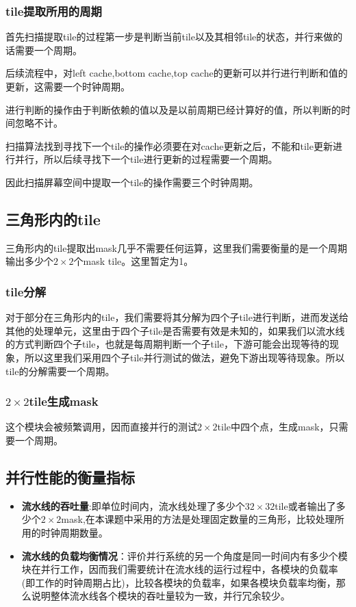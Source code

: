 \subsubsection{tile提取所用的周期}

首先扫描提取tile的过程第一步是判断当前tile以及其相邻tile的状态，并行来做的话需要一个周期。

后续流程中，对left cache,bottom cache,top cache的更新可以并行进行判断和值的更新，这需要一个时钟周期。

进行判断的操作由于判断依赖的值以及是以前周期已经计算好的值，所以判断的时间忽略不计。

扫描算法找到寻找下一个tile的操作必须要在对cache更新之后，不能和tile更新进行并行，所以后续寻找下一个tile进行更新的过程需要一个周期。

因此扫描屏幕空间中提取一个tile的操作需要三个时钟周期。

\subsection{三角形内的tile}
三角形内的tile提取出mask几乎不需要任何运算，这里我们需要衡量的是一个周期输出多少个$2\times 2$个mask tile。这里暂定为1。

\subsubsection{tile分解}

对于部分在三角形内的tile，我们需要将其分解为四个子tile进行判断，进而发送给其他的处理单元，这里由于四个子tile是否需要有效是未知的，如果我们以流水线的方式判断四个子tile，也就是每周期判断一个子tile，下游可能会出现等待的现象，所以这里我们采用四个子tile并行测试的做法，避免下游出现等待现象。所以tile的分解需要一个周期。

\subsubsection{$2\times 2$tile生成mask}

这个模块会被频繁调用，因而直接并行的测试$2\times 2$tile中四个点，生成mask，只需要一个周期。


\subsection{并行性能的衡量指标}

\begin{itemize}
    \item \textbf{流水线的吞吐量}:即单位时间内，流水线处理了多少个$32\times 32$tile或者输出了多少个$2\times 2$mask,在本课题中采用的方法是处理固定数量的三角形，比较处理所用的时钟周期数量。
    \item \textbf{流水线的负载均衡情况}：评价并行系统的另一个角度是同一时间内有多少个模块在并行工作，因而我们需要统计在流水线的运行过程中，各模块的负载率(即工作的时钟周期占比)，比较各模块的负载率，如果各模块负载率均衡，那么说明整体流水线各个模块的吞吐量较为一致，并行冗余较少。
\end{itemize}




